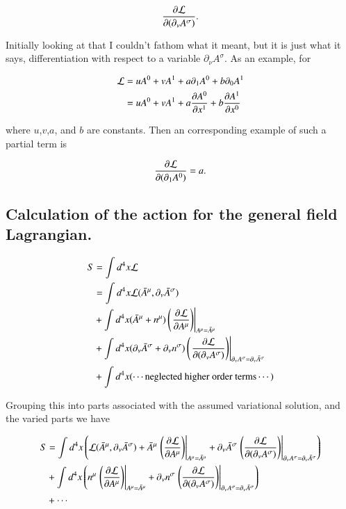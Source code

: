 \begin{align*}
\PD{(\partial_\nu A^\sigma)}{\LL}.
\end{align*}

Initially looking at that I couldn't fathom what it meant, but it is just what it says, 
differentiation with respect to a variable $\partial_\nu A^\sigma$.  As an example, for

\begin{align*}
\LL 
&= u A^0 + v A^1 + a \partial_1 A^0 + b \partial_0 A^1 \\
&= u A^0 + v A^1 + a \PD{x^1}{A^0} + b \PD{x^0}{A^1}
\end{align*}

where $u$,$v$,$a$, and $b$ are constants.  Then an corresponding example of such a partial term is

\begin{align*}
\PD{(\partial_1 A^0)}{\LL} = a.
\end{align*}

\subsection{Calculation of the action for the general field Lagrangian. }

\begin{align*}
S &= \int d^4 x \LL \\
&= \int d^4 x \LL(\barA^\mu, \partial_\nu \barA^\sigma ) \\
&+ \int d^4 x (\barA^\mu + n^\mu) \left( \left. \PD{A^\mu}{\LL} \right) \right\vert_{A^\mu = \barA^\mu} \\
&+ \int d^4 x (\partial_\nu \barA^\sigma + \partial_\nu n^\sigma) \left( \left. \PD{(\partial_\nu A^\sigma)}{\LL} \right) \right\vert_{\partial_\nu A^\sigma = \partial_\nu \barA^\sigma} \\
&+ \int d^4 x (\cdots \text{neglected higher order terms} \cdots )
\end{align*}

Grouping this into parts associated with the assumed variational solution, and the varied parts we have

\begin{align*}
S &= \int d^4 x 
\left(
\LL(\barA^\mu, \partial_\nu \barA^\sigma ) + \barA^\mu \left. \left( \PD{A^\mu}{\LL} \right) \right\vert_{A^\mu = \barA^\mu} 
+ \partial_\nu \barA^\sigma \left. \left( \PD{(\partial_\nu A^\sigma)}{\LL} \right) \right\vert_{\partial_\nu A^\sigma = \partial_\nu \barA^\sigma} 
\right) \\
&+ \int d^4 x 
\left(
n^\mu \left. \left( \PD{A^\mu}{\LL} \right) \right\vert_{A^\mu = \barA^\mu} 
+\partial_\nu n^\sigma \left. \left( \PD{(\partial_\nu A^\sigma)}{\LL} \right) \right\vert_{\partial_\nu A^\sigma = \partial_\nu \barA^\sigma}
\right) \\
&+ \cdots
\end{align*}

